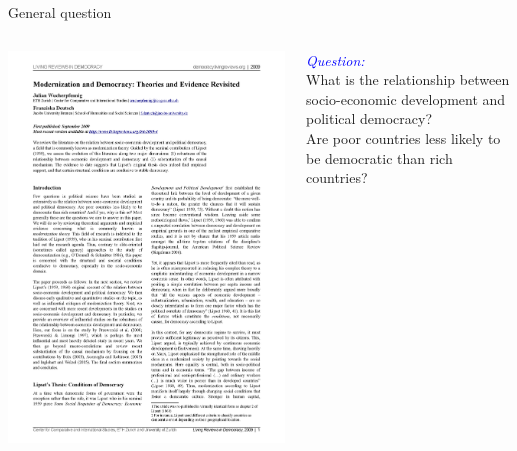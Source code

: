 \documentclass[xcolor=dvipsnames]{beamer}
\begin{document}
	\begin{frame}[fragile]{General question}
		\begin{columns}[T]
			\begin{column}{0.4\textwidth}
				\includegraphics[width=0.8\linewidth]{WucherpfenningDeutch2009.png}
			\end{column}
			
			\begin{column}{0.56\textwidth}
				\begin{center}
					\textit{\textcolor{blue}{Question:}}\\ \pause
					\bigskip		
					What is the relationship between socio-economic development and political democracy?\\ \pause
					\bigskip		
					Are poor countries less likely to be democratic than rich countries?
				\end{center}
			\end{column}
		\end{columns}
	\end{frame}
	
\end{document}
